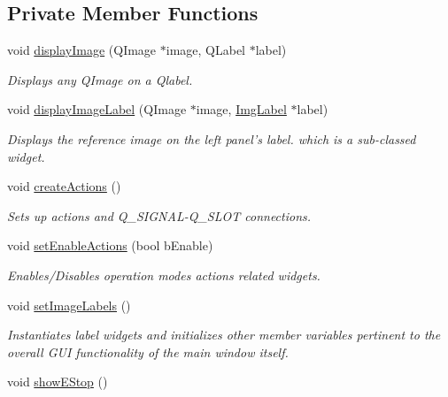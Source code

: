 \subsection*{Private Member Functions}
\begin{CompactItemize}
\item 
void \hyperlink{classQcorr_925b0715143a0afa981851547f8b9256}{displayImage} (QImage $\ast$image, QLabel $\ast$label)
\begin{CompactList}\small\item\em Displays any QImage on a Qlabel. \item\end{CompactList}\item 
void \hyperlink{classQcorr_fddb022a6024a32be3b47016308d6c50}{displayImageLabel} (QImage $\ast$image, \hyperlink{classImgLabel}{ImgLabel} $\ast$label)
\begin{CompactList}\small\item\em Displays the reference image on the left panel's label. which is a sub-classed widget. \item\end{CompactList}\item 
\hypertarget{classQcorr_54af608880477563fa8ebcb0d066b447}{
void \hyperlink{classQcorr_54af608880477563fa8ebcb0d066b447}{createActions} ()}
\label{classQcorr_54af608880477563fa8ebcb0d066b447}

\begin{CompactList}\small\item\em Sets up actions and Q\_\-SIGNAL-Q\_\-SLOT connections. \item\end{CompactList}\item 
void \hyperlink{classQcorr_2de6d6969bdf48b225acc5ebbae063f7}{setEnableActions} (bool bEnable)
\begin{CompactList}\small\item\em Enables/Disables operation modes actions related widgets. \item\end{CompactList}\item 
\hypertarget{classQcorr_17beb7cf946cdd82f587e3b4e5ee7f19}{
void \hyperlink{classQcorr_17beb7cf946cdd82f587e3b4e5ee7f19}{setImageLabels} ()}
\label{classQcorr_17beb7cf946cdd82f587e3b4e5ee7f19}

\begin{CompactList}\small\item\em Instantiates label widgets and initializes other member variables pertinent to the overall GUI functionality of the main window itself. \item\end{CompactList}\item 
\hypertarget{classQcorr_78c77e6843a6413dbf2de14ecfd4d1d8}{
void \hyperlink{classQcorr_78c77e6843a6413dbf2de14ecfd4d1d8}{showEStop} ()}
\label{classQcorr_78c77e6843a6413dbf2de14ecfd4d1d8}


\end{CompactItemize}
